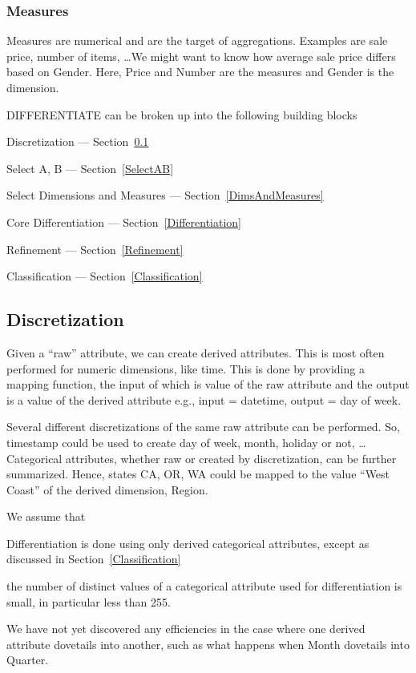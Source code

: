 \subsubsection{Measures}
Measures are numerical and are the target of aggregations. Examples are sale
price, number of items, \ldots We might want to know how average sale price
differs based on Gender. Here, Price and Number are the measures and Gender is
the dimension.

DIFFERENTIATE can be broken up into the following building blocks
\be
\item Discretization --- Section~\ref{Discretization}
\item Select A, B  --- Section~\ref{SelectAB}
\item Select Dimensions and Measures --- Section~\ref{DimsAndMeasures}
\item Core Differentiation  --- Section~\ref{Differentiation}
\item Refinement --- Section~\ref{Refinement}
\item Classification --- Section~\ref{Classification}
\ee

\subsection{Discretization}
\label{Discretization}

Given a ``raw'' attribute, we can create derived attributes. This is most often
performed for numeric dimensions, like time. This is done by providing a mapping
function, the input of which is value of the raw attribute and the output is a
value of the derived attribute e.g., input = datetime, output = day of week.

Several different discretizations of the same raw attribute can be performed.  So, timestamp could be used to create day of week, month, holiday or not, \ldots
Categorical attributes, whether raw or created by discretization, can be further
summarized. Hence, states CA, OR, WA could be mapped to the value ``West Coast''  of the derived dimension, Region.

We assume that 
\be
\item Differentiation is done using only derived categorical attributes, except
as discussed in Section~\ref{Classification}
\item the number of distinct values of a categorical 
attribute used for differentiation is small, in particular less than 255. 
\item 
We have not yet discovered any efficiencies in the case where one derived
attribute dovetails into another, such as what happens when Month 
dovetails into Quarter.
\ee

